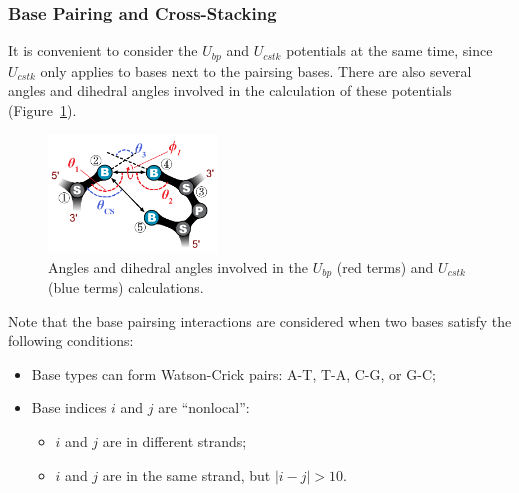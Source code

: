 \subsubsection{Base Pairing and Cross-Stacking}
\label{sec:dna_3spn2c_potential_bp_cstk}

It is convenient to consider the $U_{bp}$ and $U_{cstk}$ potentials at the same
time, since $U_{cstk}$ only applies to bases next to the pairsing bases.  There
are also several angles and dihedral angles involved in the calculation of these
potentials (Figure~\ref{fig:DNA_3spn2c_nonbonded_bp_cstk}).


\begin{figure}[ht]
  \centering
  \includegraphics[width=0.4\textwidth]{figures/DNA_3spn2c_nonbonded_bp_cstk.png}
  \caption{Angles and dihedral angles involved in the $U_{bp}$ (red terms) and
    $U_{cstk}$ (blue terms) calculations.}
  \label{fig:DNA_3spn2c_nonbonded_bp_cstk}
\end{figure}

Note that the base pairsing interactions are considered when two bases satisfy
the following conditions:
\begin{itemize}
\item Base types can form Watson-Crick pairs: A-T, T-A, C-G, or G-C;
\item Base indices $i$ and $j$ are ``nonlocal'':
  \begin{itemize}
  \item $i$ and $j$ are in different strands;
  \item $i$ and $j$ are in the same strand, but $| i - j | > 10$.
  \end{itemize}
\end{itemize}


